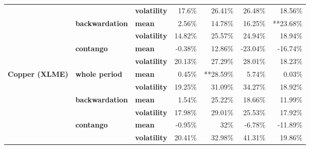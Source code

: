 \documentclass[
  authoryear,
  preprint,
  3p]{elsarticle}
\begin{document}
\begin{longtable}[t]{>{}l>{}l>{}l>{}r>{}r>{}r>{}r}
\addlinespace
\textbf{} & \textbf{} & \textbf{volatility} & \textcolor[HTML]{4285f4}{17.6\%} & \textcolor[HTML]{4285f4}{26.41\%} & \textcolor[HTML]{4285f4}{26.48\%} & \textcolor[HTML]{4285f4}{18.56\%}\\
\textbf{} & \textbf{backwardation} & \textbf{mean} & \textcolor[HTML]{4285f4}{2.56\%} & \textcolor[HTML]{4285f4}{14.78\%} & \textcolor[HTML]{4285f4}{16.25\%} & \textcolor[HTML]{4285f4}{**23.68\%}\\
\textbf{} & \textbf{} & \textbf{volatility} & \textcolor[HTML]{4285f4}{14.82\%} & \textcolor[HTML]{4285f4}{25.57\%} & \textcolor[HTML]{4285f4}{24.94\%} & \textcolor[HTML]{4285f4}{18.94\%}\\
\textbf{} & \textbf{contango} & \textbf{mean} & \textcolor[HTML]{4285f4}{-0.38\%} & \textcolor[HTML]{4285f4}{12.86\%} & \textcolor[HTML]{4285f4}{-23.04\%} & \textcolor[HTML]{4285f4}{-16.74\%}\\
\textbf{} & \textbf{} & \textbf{volatility} & \textcolor[HTML]{4285f4}{20.13\%} & \textcolor[HTML]{4285f4}{27.29\%} & \textcolor[HTML]{4285f4}{28.01\%} & \textcolor[HTML]{4285f4}{18.23\%}\\
\addlinespace
\textbf{Copper (XLME)} & \textbf{whole period} & \textbf{mean} & \textcolor[HTML]{4285f4}{0.45\%} & \textcolor[HTML]{4285f4}{**28.59\%} & \textcolor[HTML]{4285f4}{5.74\%} & \textcolor[HTML]{4285f4}{0.03\%}\\
\textbf{} & \textbf{} & \textbf{volatility} & \textcolor[HTML]{4285f4}{19.25\%} & \textcolor[HTML]{4285f4}{31.09\%} & \textcolor[HTML]{4285f4}{34.27\%} & \textcolor[HTML]{4285f4}{18.92\%}\\
\textbf{} & \textbf{backwardation} & \textbf{mean} & \textcolor[HTML]{4285f4}{1.54\%} & \textcolor[HTML]{4285f4}{25.22\%} & \textcolor[HTML]{4285f4}{18.66\%} & \textcolor[HTML]{4285f4}{11.99\%}\\
\textbf{} & \textbf{} & \textbf{volatility} & \textcolor[HTML]{4285f4}{17.98\%} & \textcolor[HTML]{4285f4}{29.01\%} & \textcolor[HTML]{4285f4}{25.53\%} & \textcolor[HTML]{4285f4}{17.92\%}\\
\textbf{} & \textbf{contango} & \textbf{mean} & \textcolor[HTML]{4285f4}{-0.95\%} & \textcolor[HTML]{4285f4}{32\%} & \textcolor[HTML]{4285f4}{-6.78\%} & \textcolor[HTML]{4285f4}{-11.89\%}\\
\addlinespace
\textbf{} & \textbf{} & \textbf{volatility} & \textcolor[HTML]{4285f4}{20.41\%} & \textcolor[HTML]{4285f4}{32.98\%} & \textcolor[HTML]{4285f4}{41.31\%} & \textcolor[HTML]{4285f4}{19.86\%}\\

\end{longtable}
\end{document}
